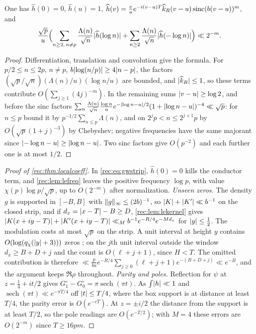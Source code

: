 \begin{lemma}\label{rec:lem:lefreq}
One has $\widehat h(0)=0$, $\widehat h(u)=1$,
$\widehat h(v)=\frac vue^{-i(v-u)T}\widehat k_R(v-u)\operatorname{sinc}(b(v-u))^m$, and
\[
 \frac{\sqrt p}u\Bigl(\sum_{n\ge2,\,n\ne p}\frac{\Lambda(n)}{\sqrt n}\lvert\widehat h(\log n)\rvert
 +\sum_{n\ge2}\frac{\Lambda(n)}{\sqrt n}\lvert\widehat h(-\log n)\rvert\Bigr)\ll2^{-m}.
\]
\end{lemma}

\begin{proof}
Differentiation, translation and convolution give the formula. For $p/2\le n\le2p$, $n\ne p$,
$b\lvert\log(n/p)\rvert\ge4\lvert n-p\rvert$, the factors $(\sqrt p/\sqrt n)(\Lambda(n)/u)(\log n/u)$ are bounded,
and $\lvert\widehat k_R\rvert\le1$, so these terms contribute $O(\sum_{j\ge1}(4j)^{-m})$. In the remaining
sums $\lvert v-u\rvert\ge\log2$, and before the sinc factors
$\sum_n\frac{\Lambda(n)}{\sqrt n}\frac{\log n}ue^{-\lvert\log n-u\rvert/2}(1+\lvert\log n-u\rvert)^{-4}\ll\sqrt p$: for
$n\le p$ bound it by $p^{-1/2}\sum_{n\le p}\Lambda(n)$, and on $2^jp<n\le2^{j+1}p$ by
$O(\sqrt p(1+j)^{-3})$ by Chebyshev; negative frequencies have the same majorant since
$\lvert-\log n-u\rvert\ge\lvert\log n-u\rvert$. Two sinc factors give $O(p^{-2})$ and each further one is at most
$1/2$.
\end{proof}

\begin{proof}[Proof of \cref{rec:thm:localcoeff}]
In \eqref{rec:eq:gwstrip}, $\widehat h(0)=0$ kills the conductor term, and \cref{rec:lem:lefreq} leaves
the positive frequency $\log p$, with value $\chi(p)\log p/\sqrt p$, up to $O(2^{-m})$ after
normalization. \emph{Unseen zeros.} The density $g$ is supported in $[-B,B]$ with
$\lVert g\rVert_\infty\le(2b)^{-1}$, so $\lvert K\rvert+\lvert K'\rvert\ll b^{-1}$ on the closed strip, and if
$d_x=\lvert x-T\rvert-B\ge D$, \cref{rec:lem:lekernel} gives
$\lvert K(x+iy-T)\rvert+\lvert K'(x+iy-T)\rvert\ll_Mb^{-1}e^{-R/4}e^{-Md_x}$ for $\lvert y\rvert\le\tfrac12$. The modulation
costs at most $\sqrt p$ on the strip. A unit interval at height $y$ contains
$O(\log(q_\chi(\lvert y\rvert+3)))$ zeros \cite{BennettMartinOBryantRechnitzer2021Counting}; on the $j$th unit
interval outside the window $d_x\ge B+D+j$ and the count is $O(\ell+j+1)$, since $H<T$. The omitted
contribution is therefore $\ll\frac p{bu}e^{-R/4}\sum_{j\ge0}(\ell+j+1)e^{-(B+D+j)}\ll e^{-B}$, and the
argument keeps $\Re\rho$ throughout. \emph{Parity and poles.} Reflection for $\psi$ at
$z=\tfrac14+it/2$ gives $G_1^\circ-G_0^\circ=\pi\operatorname{sech}(\pi t)$. As $\int\lvert h\rvert\ll1$ and
$\operatorname{sech}(\pi t)\ll e^{-\pi T/4}$ off $\lvert t\rvert\le T/4$, where the box support is at distance at least
$T/4$, the parity error is $O(e^{-cT})$. At $z=\pm i/2$ the distance from the support is at least
$T/2$, so the pole readings are $O(e^{-T/2})$; with $M=4$ these errors are $O(2^{-m})$ since
$T\ge16pm$.
\end{proof}

